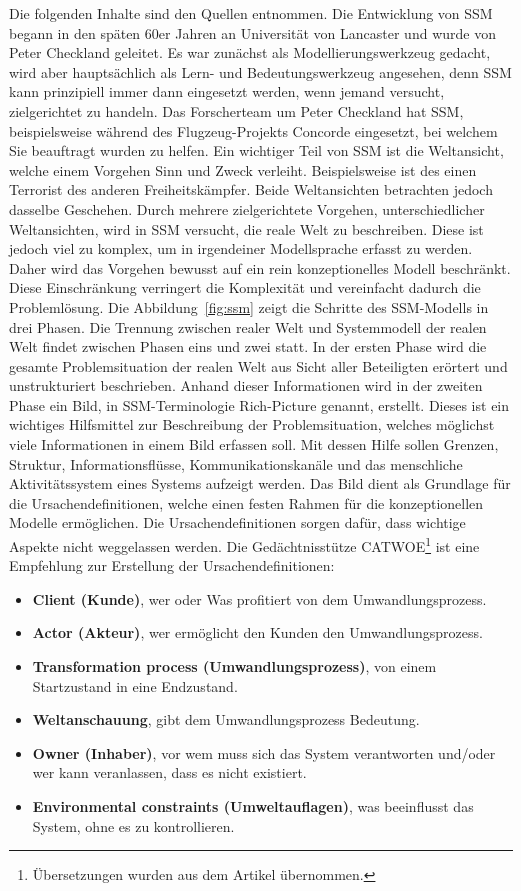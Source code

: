 \documentclass[11pt,a4paper]{report}
\begin{document}
Die folgenden Inhalte sind den Quellen \cite{checkland, bobwill, ssmger} entnommen. Die Entwicklung von SSM begann in den späten 60er Jahren an Universität von Lancaster und wurde von Peter Checkland geleitet. Es war zunächst als Modellierungswerkzeug gedacht, wird aber hauptsächlich als Lern- und Bedeutungswerkzeug angesehen, denn SSM kann prinzipiell immer dann eingesetzt werden, wenn jemand versucht, zielgerichtet zu handeln. Das Forscherteam um Peter Checkland hat SSM, beispielsweise während des Flugzeug-Projekts Concorde eingesetzt, bei welchem Sie beauftragt wurden zu helfen. Ein wichtiger Teil von SSM ist die Weltansicht, welche einem Vorgehen Sinn und Zweck verleiht. Beispielsweise ist des einen Terrorist des anderen Freiheitskämpfer. Beide Weltansichten betrachten jedoch dasselbe Geschehen. Durch mehrere zielgerichtete Vorgehen, unterschiedlicher Weltansichten, wird in SSM versucht, die reale Welt zu beschreiben. Diese ist jedoch viel zu komplex, um in irgendeiner Modellsprache erfasst zu werden. Daher wird das Vorgehen bewusst auf ein rein konzeptionelles Modell beschränkt. Diese Einschränkung verringert die Komplexität und vereinfacht dadurch die Problemlösung. Die Abbildung~\ref{fig:ssm} zeigt die Schritte des SSM-Modells in drei Phasen. Die Trennung zwischen realer Welt und Systemmodell der realen Welt findet zwischen Phasen eins und zwei statt. In der ersten Phase wird die gesamte Problemsituation der realen Welt aus Sicht aller Beteiligten erörtert und unstrukturiert beschrieben. Anhand dieser Informationen wird in der zweiten Phase ein Bild, in SSM-Terminologie Rich-Picture genannt, erstellt. Dieses ist ein wichtiges Hilfsmittel zur Beschreibung der Problemsituation, welches möglichst viele Informationen in einem Bild erfassen soll. Mit dessen Hilfe sollen Grenzen, Struktur, Informationsflüsse, Kommunikationskanäle und das menschliche Aktivitätssystem eines Systems aufzeigt werden. Das Bild dient als Grundlage für die Ursachendefinitionen, welche einen festen Rahmen für die konzeptionellen Modelle ermöglichen. Die Ursachendefinitionen sorgen dafür, dass wichtige Aspekte nicht weggelassen werden. Die Gedächtnisstütze CATWOE\footnote{Übersetzungen wurden aus dem Artikel \cite{ssmger} übernommen.} ist eine Empfehlung zur Erstellung der Ursachendefinitionen:

\begin{itemize}[leftmargin=*]
\item \textbf{Client (Kunde)}, wer oder Was profitiert von dem Umwandlungsprozess.
\item \textbf{Actor (Akteur)}, wer ermöglicht den Kunden den Umwandlungsprozess.
\item \textbf{Transformation process (Umwandlungsprozess)}, von einem Startzustand in eine Endzustand.
\item \textbf{Weltanschauung}, gibt dem Umwandlungsprozess Bedeutung.
\item \textbf{Owner (Inhaber)}, vor wem muss sich das System verantworten und/oder wer kann veranlassen, dass es nicht existiert.
\item \textbf{Environmental constraints (Umweltauflagen)}, was beeinflusst das System, ohne es zu kontrollieren.
\end{itemize}
\end{document}
